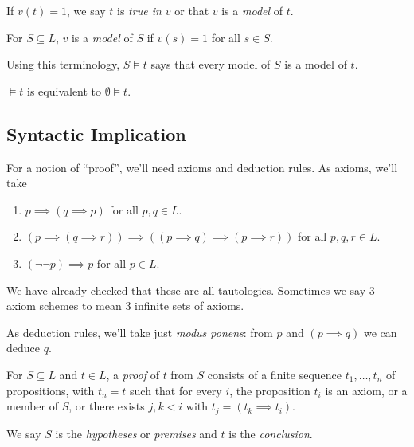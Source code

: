 \documentclass[a4paper]{article}
\begin{document}
\begin{definition}[Model]
  If \(v(t) = 1\), we say \(t\) is \emph{true in \(v\)} or that \(v\) is a \emph{model} of \(t\).

  For \(S \subseteq L\), \(v\) is a \emph{model} of \(S\) if \(v(s) = 1\) for all \(s \in S\).
\end{definition}

Using this terminology, \(S \models t\) says that every model of \(S\) is a model of \(t\).

\begin{note}
  \(\models t\) is equivalent to \(\emptyset \models t\).
\end{note}

\subsection{Syntactic Implication}

For a notion of ``proof'', we'll need axioms and deduction rules. As axioms, we'll take
\begin{enumerate}
\item \(p \implies (q \implies p)\) for all \(p, q \in L\).
\item \((p \implies (q \implies r)) \implies ((p \implies q) \implies (p \implies r))\) for all \(p, q, r \in L\).
\item \((\neg \neg p) \implies p\) for all \(p \in L\).
\end{enumerate}

\begin{note}
  We have already checked that these are all tautologies. Sometimes we say 3 axiom schemes to mean 3 infinite sets of axioms.
\end{note}

As deduction rules, we'll take just \emph{modus ponens}: from \(p\) and \((p \implies q)\) we can deduce \(q\).

\begin{definition}[Proof]
  For \(S \subseteq L\) and \(t \in L\), a \emph{proof} of \(t\) from \(S\) consists of a finite sequence \(t_1, \dots, t_n\) of propositions, with \(t_n = t\) such that for every \(i\), the proposition \(t_i\) is an axiom, or a member of \(S\), or there exists \(j, k < i\) with \(t_j = (t_k \implies t_i)\).

  We say \(S\) is the \emph{hypotheses} or \emph{premises} and \(t\) is the \emph{conclusion}.
\end{definition}
\end{document}
